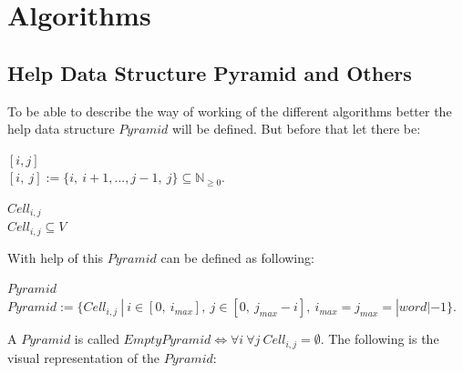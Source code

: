 
\section{Algorithms}\label{algorithms}

\subsection{Help Data Structure Pyramid and Others}

To be able to describe the way of working of the different algorithms better the help data structure $Pyramid$ will be defined. But before that let there be:
\begin{DefGrey} \textbf{$[i, j]$} \\
	$[i,\ j] := \{i,\ i+1,..., j-1,\ j\} \subseteq \mathbb{N}_{\geq 0}$.
\end{DefGrey}
\begin{DefGrey} \textbf{$Cell_{i,j}$} \\
	$Cell_{i,j} \subseteq V$
\end{DefGrey}
\noindent With help of this $Pyramid$ can be defined as following:
\begin{DefGrey} \textbf{$Pyramid$} \\
$Pyramid :=\{ Cell_{i,j}\ |\ i \in [0,\ i_{max}],\  j \in [0,\ j_{max}-i],\ i_{max} = j_{max} = |word|-1\}$.
\end{DefGrey}
\noindent A $Pyramid$ is called $EmptyPyramid \Leftrightarrow \forall i\ \forall j\ Cell_{i,j}=\emptyset$. \noindent The following is the visual representation of the $Pyramid$:
\newcommand{\boxpyramid}[1]{
\fontsize{5}{12}\selectfont{#1}
}


